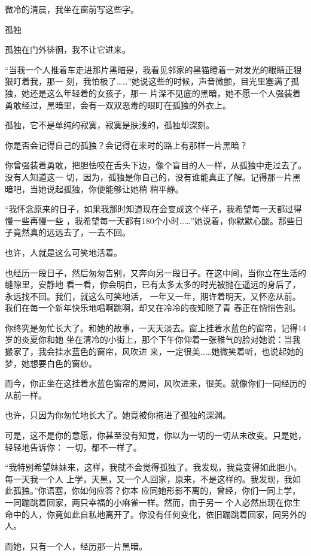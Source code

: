 \documentclass[12pt,a4paper]{article}
\newcommand{\subpart}[1]{
	\begingroup \par
	\vspace{1ex} \centering #1
	\par \endgroup \nopagebreak[4]
}
\begin{document}
		微冷的清晨，我坐在窗前写这些字。

		\subpart{孤独}
		孤独在门外徘徊，我不让它进来。

		“当我一个人推着车走进那片黑暗是，我看见邻家的黑猫瞪着一对发光的眼睛正狠狠盯着我，那一
	刻，我怕极了……”她说这些的时候，声音微颤，目光里塞满了孤独，她还是这么年轻着的女孩子，那一
	片深不见底的黑暗，她不愿一个人强装着勇敢经过，黑暗里，会有一双双恶毒的眼盯在孤独的外衣上。

		孤独，它不是单纯的寂寞，寂寞是肤浅的，孤独却深刻。

		你是否会记得自己的孤独？会记得在来时的路上有那样一片黑暗？

		你曾强装着勇敢，把胆怯咬在舌头下边，像个盲目的人一样，从孤独中走过去了。没有人知道这一
	切，因为，孤独是你自己的，没有谁能真正了解。记得那一片黑暗吧，当她说起孤独，你便能够让她稍
	稍平静。

		“我怀念原来的日子，如果我那时知道现在会变成这个样子，我希望每一天都过得慢一些再慢一些
	，我希望每一天都有180个小时……”她说着，你默默心酸。那些日子竟然真的远远去了，一去不回。

		也许，人就是这么可笑地活着。

		也经历一段日子，然后匆匆告别，又奔向另一段日子。在这中间，当你立在生活的缝隙里，安静地
	看一看，你会明白，已有太多太多的时光被抛在遥远的身后了，永远找不回。我们，就这么可笑地活，
	一年又一年，期许着明天，又怀恋从前。我们在每一个新年快乐地唱啊跳啊，却又在冷冷的夜知晓了青
	春正在悄悄告别。

		你终究是匆忙长大了。和她的故事，一天天淡去。窗上挂着水蓝色的窗帘，记得14岁的炎夏你和她
	坐在清冷的小街上，那个下午你仰着一张稚气的脸对她说：当我搬家了，我会挂水蓝色的窗帘，风吹进
	来，一定很美……她微笑着听，也说起她的梦，她想要白色的窗纱。

		而今，你正坐在这挂着水蓝色窗帘的房间，风吹进来，很美。就像你们一同经历的从前一样。

		也许，只因为你匆忙地长大了。她竟被你拖进了孤独的深渊。

		可是，这不是你的意愿，你甚至没有知觉，你以为一切的一切从未改变。只是她，轻轻地告诉你：
	一切，都不一样了。

		“我特别希望妹妹来，这样，我就不会觉得孤独了。我发现，我竟变得如此胆小。每一天我一个人
	上学，天黑，又一个人回家，原来，不是这样的。我发现，我如此孤独。”你语塞，你如何应答？你本
	应同她形影不离的，曾经，你们一同上学，一同蹦跳着回家，两只幸福的小麻雀一样。然而，由于另一
	个人必然出现在你生命中的人，你竟如此自私地离开了。你没有任何变化，依旧蹦跳着回家，同另外的
	人。

		而她，只有一个人，经历那一片黑暗。
\end{document}
